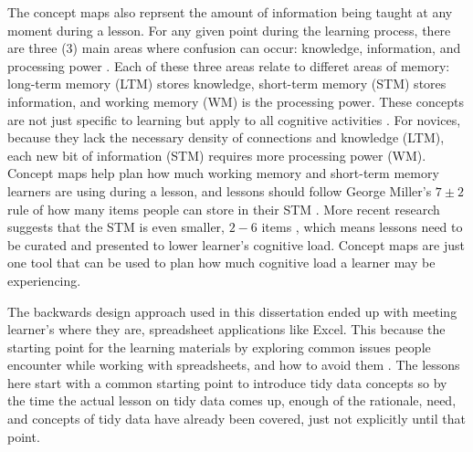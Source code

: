\documentclass[010-intro.tex]{subfiles}
\begin{document}
        The concept maps also reprsent the amount of information being taught at any moment during a lesson.
        For any given point during the learning process,
        there are three (3) main areas where confusion can occur:
        knowledge, information, and processing power \cite{hermansProgrammerBrain2021}.
        Each of these three areas relate to differet areas of memory:
        long-term memory (LTM) stores knowledge,
        short-term memory (STM) stores information, and
        working memory (WM) is the processing power.
        These concepts are not just specific to learning but apply to all cognitive activities
        \cite{hermansProgrammerBrain2021}.
        For novices, because they lack the necessary density of connections and knowledge (LTM),
        each new bit of information (STM) requires more processing power (WM).
        Concept maps help plan how much working memory and short-term memory learners are using during a lesson,
        and lessons should follow George Miller's $7\pm2$ rule of how many items people can store in their STM
        \cite{miller1956magical}.
        More recent research suggests that the STM is even smaller, $2-6$ items
        \cite{hermansProgrammerBrain2021},
        which means lessons need to be curated and presented to lower learner's cognitive load.
        Concept maps are just one tool that can be used to plan how much cognitive load a learner may be experiencing.

        The backwards design approach used in this dissertation ended up with meeting learner's where they are,
        spreadsheet applications like Excel.
        This because the starting point for the learning materials by exploring common issues people encounter while
        working with spreadsheets, and how to avoid them
        \cite{bromanDataOrganizationSpreadsheets2018}.
        The lessons here start with a common starting point to introduce tidy data concepts so by
        the time the actual lesson on tidy data comes up,
        enough of the rationale, need, and concepts of tidy data have already been covered,
        just not explicitly until that point.
\end{document}
